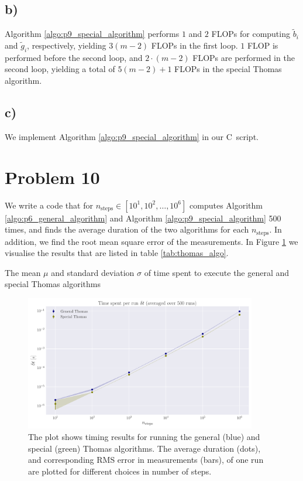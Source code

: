 \documentclass[english,notitlepage,nofootinbib]{revtex4-1}  %
\newcommand{\Fig}[1]{Figure \ref{fig:#1}}
\newcommand{\Algo}[1]{Algorithm \ref{algo:#1}}
\newcommand{\CC}{C\nolinebreak\hspace{-.05em}\raisebox{.4ex}{\tiny\bf +}\nolinebreak\hspace{-.10em}\raisebox{.4ex}{\tiny\bf +}}
\begin{document}
\subsection*{b)}

\Algo{p9_special_algorithm} performs $1$ and $2$ FLOPs for computing $\tilde{b}_i$ and $\tilde{g}_i$, respectively, yielding $3(m-2)$ FLOPs in the first loop. $1$ FLOP is performed before the second loop, and $2 \cdot (m-2)$ FLOPs are performed in the second loop, yielding a total of $5(m-2)+1$ FLOPs in the special Thomas algorithm.

\subsection*{c)}

We implement \Algo{p9_special_algorithm} in our \CC\, script. 

\section*{Problem 10}

We write a code that for $n_\text{steps}\in[10^{1}, 10^{2}, \dots, 10^{6}]$ computes \Algo{p6_general_algorithm} and \Algo{p9_special_algorithm} 500 times, and finds the average duration of the two algorithms for each $n_\mathrm{steps}$. In addition, we find the root mean square error of the measurements. In \Fig{p10_timed} we visualise the results that are listed in table \ref{tab:thomas_algo}.

\begin{table}
    \caption{The mean $\mu$ and standard deviation $\sigma$ of time spent to execute the general and special Thomas algorithms}
    \label{tab:thomas_algo}  
    
\end{table}

\begin{figure}[h!]
    \centering
    \includegraphics[width=0.9\textwidth]{algorithms_timed.pdf}
    \caption{ The plot shows timing results for running the general (blue) and special (green) Thomas algorithms. The average duration (dots), and corresponding RMS error in measurements (bars), of one run are plotted for different choices in number of steps.}\label{fig:p10_timed}
\end{figure}
\end{document}
